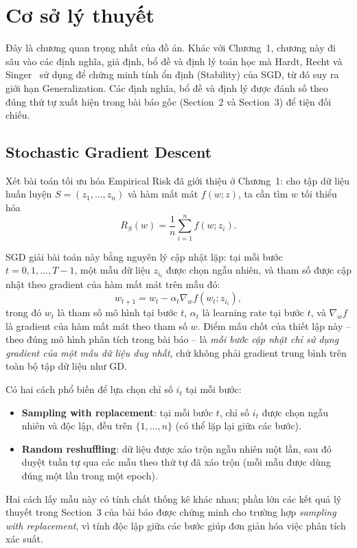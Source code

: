 \chapter{Cơ sở lý thuyết}
\label{chap:coso}

Đây là chương quan trọng nhất của đồ án. Khác với Chương~1, chương này đi sâu vào các định nghĩa, giả định, bổ đề và định lý toán học mà Hardt, Recht và Singer~\cite{hardt2016train} sử dụng để chứng minh tính ổn định (Stability) của SGD, từ đó suy ra giới hạn Generalization. Các định nghĩa, bổ đề và định lý được đánh số theo đúng thứ tự xuất hiện trong bài báo gốc (Section~2 và Section~3) để tiện đối chiếu.

\section{Stochastic Gradient Descent}
\label{sec:sgd-toanhoc}

Xét bài toán tối ưu hóa Empirical Risk đã giới thiệu ở Chương~1: cho tập dữ liệu huấn luyện $S = (z_1, \ldots, z_n)$ và hàm mất mát $f(w; z)$, ta cần tìm $w$ tối thiểu hóa
\[
R_S(w) = \frac{1}{n}\sum_{i=1}^{n} f(w; z_i).
\]

SGD giải bài toán này bằng nguyên lý cập nhật lặp: tại mỗi bước $t = 0, 1, \ldots, T-1$, một mẫu dữ liệu $z_{i_t}$ được chọn ngẫu nhiên, và tham số được cập nhật theo gradient của hàm mất mát trên mẫu đó:
\[
w_{t+1} = w_t - \alpha_t \nabla_w f(w_t; z_{i_t}),
\]
trong đó $w_t$ là tham số mô hình tại bước $t$, $\alpha_t$ là learning rate tại bước $t$, và $\nabla_w f$ là gradient của hàm mất mát theo tham số $w$. Điểm mấu chốt của thiết lập này -- theo đúng mô hình phân tích trong bài báo -- là \emph{mỗi bước cập nhật chỉ sử dụng gradient của một mẫu dữ liệu duy nhất}, chứ không phải gradient trung bình trên toàn bộ tập dữ liệu như GD.

Có hai cách phổ biến để lựa chọn chỉ số $i_t$ tại mỗi bước:
\begin{itemize}
    \item \textbf{Sampling with replacement}: tại mỗi bước $t$, chỉ số $i_t$ được chọn ngẫu nhiên và độc lập, đều trên $\{1, \ldots, n\}$ (có thể lặp lại giữa các bước).
    \item \textbf{Random reshuffling}: dữ liệu được xáo trộn ngẫu nhiên một lần, sau đó duyệt tuần tự qua các mẫu theo thứ tự đã xáo trộn (mỗi mẫu được dùng đúng một lần trong một epoch).
\end{itemize}
Hai cách lấy mẫu này có tính chất thống kê khác nhau; phần lớn các kết quả lý thuyết trong Section~3 của bài báo được chứng minh cho trường hợp \textit{sampling with replacement}, vì tính độc lập giữa các bước giúp đơn giản hóa việc phân tích xác suất.


